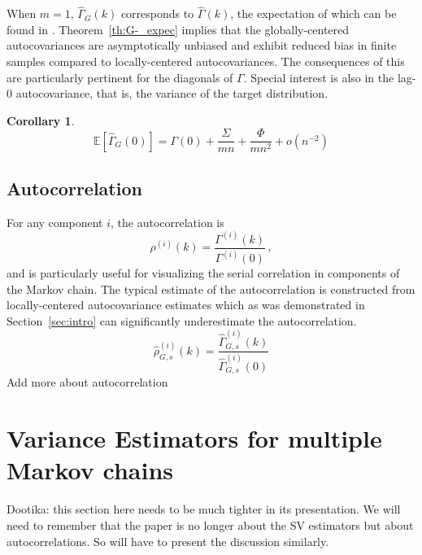 \documentclass[11pt]{article}
\newtheorem{corollary}{Corollary}
\theoremstyle{remark}
\begin{document}


When $m = 1$, $\hat{\Gamma}_G(k)$ corresponds to $\hat{\Gamma}(k)$, the expectation of which can be found in \cite{priestley1981spectral}. Theorem~\ref{th:G-_expec} implies that the globally-centered autocovariances are asymptotically unbiased and exhibit reduced bias in finite samples compared to locally-centered autocovariances. The consequences of this are particularly pertinent for the diagonals of $\Gamma$. Special interest is also in the lag-0 autocovariance, that is, the variance of the target distribution. 

\begin{corollary} \label{cor:lag0_expectation}
\[
\mathbb{E} \left[\hat{\Gamma}_{G}(0) \right] = \Gamma(0) + \dfrac{\Sigma}{mn} + \dfrac{\Phi}{mn^2} + o(n^{-2})
\]
\end{corollary}

\subsection{Autocorrelation} %
\label{sub:autocorrelation}

For any component $i$, the autocorrelation is
\[
\rho^{(i)}(k) = \dfrac{\Gamma^{(i)}(k)}{\Gamma^{(i)}(0)}\,,
\]
and is particularly useful for visualizing the serial correlation in components of the Markov chain. The typical estimate of the autocorrelation is constructed from  locally-centered autocovariance estimates which as was demonstrated in Section~\ref{sec:intro} can significantly underestimate the autocorrelation. 
\[
\hat{\rho}_{G,s}^{(i)}(k) = \dfrac{ \hat{\Gamma}^{(i)}_{G,s} (k)}{\hat{\Gamma}^{(i)}_{G,s} (0)}
\]
{\color{blue} Add more about autocorrelation}



\section{Variance Estimators for multiple Markov chains} \label{sec:variance_est}

{\color{blue}Dootika: this section here needs to be much tighter in its presentation. We will need to remember that the paper is no longer about the SV estimators but about autocorrelations. So will have to present the discussion similarly. }
\end{document}
